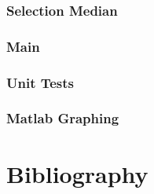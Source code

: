 \documentclass{article}
\begin{document}
        \subsubsection{Selection Median}
            

        \subsubsection{Main}
            

        \subsubsection{Unit Tests}
            
        \subsubsection{Matlab Graphing}
            
        \newpage
\section{Bibliography}
    
\end{document}
